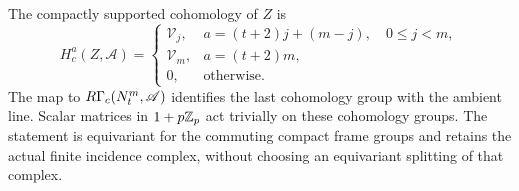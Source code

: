 \begin{proposition}\label{prop:compact-support}
The compactly supported cohomology of $Z$ is
\[
 H_c^a(Z,\mathscr A)=
 \begin{cases}
  \mathcal V_j,&a=(t+2)j+(m-j),\quad 0\leq j<m,\\
  \mathcal V_m,&a=(t+2)m,\\
  0,&\text{otherwise}.
 \end{cases}
\]
The map to $R\Gamma_c(N_t^m,\mathscr A)$ identifies the last
cohomology group with the ambient line.  Scalar matrices in
$1+p\mathbb Z_p$ act trivially on these cohomology groups.  The statement
is equivariant for the commuting compact frame groups and retains
the actual finite incidence complex, without choosing an
equivariant splitting of that complex.
\end{proposition}

